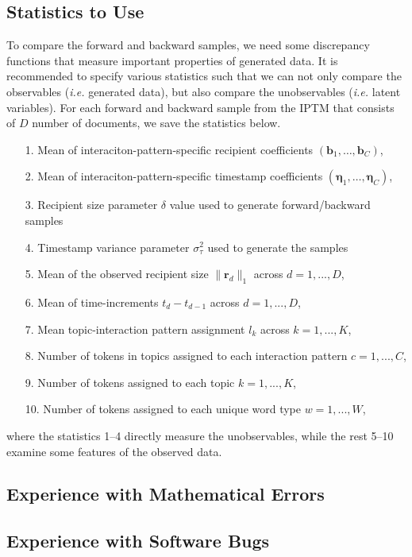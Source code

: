 \documentclass[a4paper]{article}
\begin{document}
\subsection{Statistics to Use}
To compare the forward and backward samples, we need some discrepancy functions that measure important properties of generated data. It is recommended to specify various statistics such that we can not only compare the observables (\textit{i.e.} generated data), but also compare the unobservables (\textit{i.e.} latent variables).  For each forward and backward sample from the IPTM that consists of $D$ number of documents, we save the statistics below.
      \begin{itemize}
      	\item[1.] Mean of interaciton-pattern-specific recipient coefficients $(\boldsymbol{b}_1,\ldots,\boldsymbol{b}_C)$,
      	\item[2.] Mean of interaciton-pattern-specific timestamp coefficients $(\boldsymbol{\eta}_1,\ldots,\boldsymbol{\eta}_C)$,
      	\item[3.] Recipient size parameter $\delta$ value used to generate forward/backward samples
      	\item[4.] Timestamp variance parameter $\sigma_\tau^2$ used to generate the samples
        \item[5.] Mean of the observed recipient size $ \lVert\boldsymbol{r}_d\rVert_1 $ across $d=1,...,D$,
      	\item[6.] Mean of time-increments $t_d-t_{d-1}$ across $d=1,...,D$,
      	\item[7.] Mean topic-interaction pattern assignment $l_k$ across $k=1,...,K$, 
      	\item[8.] Number of tokens in topics assigned to each interaction pattern $c=1,...,C$,
      	\item[9.] Number of tokens assigned to each topic $k=1,...,K$, 
       \item[10.] Number of tokens assigned to each unique word type $w=1,...,W$,
      	 \end{itemize}
where the statistics 1--4 directly measure the unobservables, while the rest 5--10 examine some features of the observed data.
\subsection{Experience with Mathematical Errors}
\subsection{Experience with Software Bugs}
\end{document}
